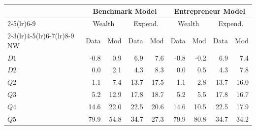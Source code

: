 \def\sym#1{\ifmmode^{#1}\else\(^{#1}\)\fi}

\centering
\begin{tabular*}{0.98\textwidth}{@{\extracolsep{\fill}}lrrrrrrrr@{}}
\toprule \toprule
 & \multicolumn{4}{c}{Benchmark Model} & \multicolumn{4}{c}{Entrepreneur Model} \\
\cmidrule(lr){2-5}\cmidrule(lr){6-9}
& \multicolumn{2}{c}{Wealth} & \multicolumn{2}{c}{Expend.} & \multicolumn{2}{c}{Wealth} & \multicolumn{2}{c}{Expend.} \\
\cmidrule(lr){2-3}\cmidrule(lr){4-5}\cmidrule(lr){6-7}\cmidrule(lr){8-9}
NW & Data & Mod & Data & Mod & Data & Mod & Data & Mod \\
\midrule
$D1$ & -0.8 & 0.9 & 6.9 & 7.6 & -0.8 & -0.2 & 6.9 &  7.4\\
$D2$ &  0.0 & 2.1 & 4.3 & 8.3 & 0.0  &  0.5 & 4.3 &  7.8\\
$Q2$ & 1.1  & 7.4 & 13.7 & 17.5 & 1.1 & 2.8 & 13.7 &  16.0\\
$Q3$ & 5.2 & 12.9 & 17.8 & 18.7 & 5.2 & 5.5 & 17.8 & 16.7\\
$Q4$ & 14.6 & 22.0 & 22.5 & 20.6 & 14.6 & 10.5 & 22.5 & 17.9 \\
$Q5$ & 79.9 & 54.8 & 34.7 & 27.3 & 79.9 & 80.8 & 34.7 & 34.2\\
\bottomrule \bottomrule
\end{tabular*}

